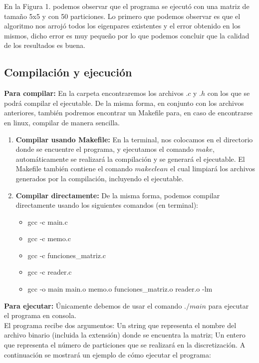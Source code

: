 \documentclass[12pt]{article}
\begin{document}
En la Figura 1. podemos observar que el programa se ejecutó con una matriz de tamaño 5x5 y con 50 particiones. Lo primero que podemos observar es que el algoritmo nos arrojó todos los eigenpares existentes y el error obtenido en los mismos, dicho error es muy pequeño por lo que podemos concluir que la calidad de los resultados es buena.

\subsection{Compilación y ejecución}
\textbf{Para compilar:} En la carpeta encontraremos los archivos $.c$ y $.h$ con los que se podrá compilar el ejecutable. De la misma forma, en conjunto con los archivos anteriores, también podremos encontrar un Makefile para, en caso de encontrarse en linux, compilar de manera sencilla.

\begin{enumerate}
	\item \textbf{Compilar usando Makefile:} En la terminal, nos colocamos en el directorio donde se encuentre el programa, y ejecutamos el comando $make$, automáticamente se realizará la compilación y se generará el ejecutable. El Makefile también contiene el comando $make clean$ el cual limpiará los archivos generados por la compilación, incluyendo el ejecutable.
	\item \textbf{Compilar directamente:} De la misma forma, podemos compilar directamente usando los siguientes comandos (en terminal):
	\begin{itemize}
		\item gcc -c main.c
		\item gcc -c memo.c
		\item gcc -c funciones\_matriz.c
		\item gcc -c reader.c
		\item gcc -o main main.o memo.o funciones\_matriz.o reader.o -lm
	\end{itemize}
\end{enumerate}

\textbf{Para ejecutar:} Únicamente debemos de usar el comando $./main$ para ejecutar el programa en consola.\\
El programa recibe dos argumentos: Un string que representa el nombre del archivo binario (incluida la extensión) donde se encuentra la matriz; Un entero que representa el número de particiones que se realizará en la discretización. A continuación se mostrará un ejemplo de cómo ejecutar el programa:\\
\end{document}
